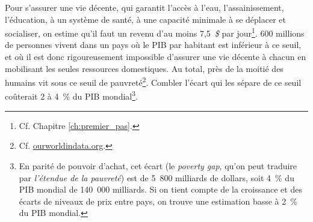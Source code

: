 \documentclass[a5paper,french,openany]{memoir}
\begin{document}
Pour s'assurer une vie décente, qui garantit l'accès à l'eau, l'assainissement, l'éducation, à un système de santé, à une capacité minimale à se déplacer et socialiser, on estime qu'il faut un revenu d'au moins 7,5~\textit{\$} par jour\footnote{Cf. Chapitre \ref{ch:premier_pas}.}. 
600 millions de personnes vivent dans un pays où le PIB par habitant est inférieur à ce seuil, et où il est donc rigoureusement impossible d'assurer une vie décente à chacun en mobilisant les seules ressources domestiques. 
Au total, près de la moitié des humains vit sous ce seuil de pauvreté\footnote{Cf. \href{https://ourworldindata.org/grapher/distribution-of-population-between-different-poverty-thresholds-up-to-30-dollars}{ourworldindata.org}.}. Combler l'écart qui les sépare de ce seuil coûterait 2 à 4~\% du PIB mondial\footnote{En parité de pouvoir d'achat, cet écart (le \textit{poverty gap}, qu'on peut traduire par \textit{l'étendue de la pauvreté}) est de 5~800 milliards de dollars, soit 4~\% du PIB mondial de 140~000 milliards. Si on tient compte de la croissance et des écarts de niveaux de prix entre pays, on trouve une estimation basse à 2~\% du PIB mondial.}. %
\end{document}
